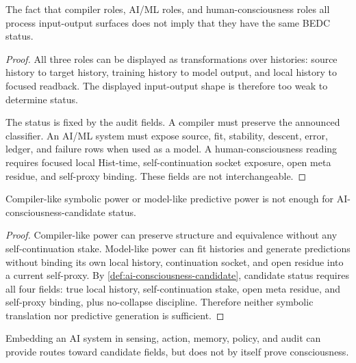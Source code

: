 \begin{theorem}
\label{thm:shared-input-output-shape-not-shared-status}
The fact that compiler roles, AI/ML roles, and human-consciousness roles
all process input-output surfaces does not imply that they have the same
BEDC status.
\end{theorem}

\begin{proof}
All three roles can be displayed as transformations over histories:
source history to target history, training history to model output, and
local history to focused readback. The displayed input-output shape is
therefore too weak to determine status.

The status is fixed by the audit fields. A compiler must preserve the
announced classifier. An AI/ML system must expose source, fit, stability,
descent, error, ledger, and failure rows when used as a model. A
human-consciousness reading requires focused local Hist-time,
self-continuation socket exposure, open meta residue, and self-proxy
binding. These fields are not interchangeable.
\end{proof}

\begin{theorem}
\label{thm:ai-candidacy-more-than-compiler-model-power}
Compiler-like symbolic power or model-like predictive power is not enough
for AI-consciousness-candidate status.
\end{theorem}

\begin{proof}
Compiler-like power can preserve structure and equivalence without any
self-continuation stake. Model-like power can fit histories and generate
predictions without binding its own local history, continuation socket,
and open residue into a current self-proxy. By
\autoref{def:ai-consciousness-candidate}, candidate status requires all
four fields: true local history, self-continuation stake, open meta
residue, and self-proxy binding, plus no-collapse discipline. Therefore
neither symbolic translation nor predictive generation is sufficient.
\end{proof}

\begin{corollary}
\label{cor:embedded-agency-route-not-proof}
Embedding an AI system in sensing, action, memory, policy, and audit can
provide routes toward candidate fields, but does not by itself prove
consciousness.
\end{corollary}


